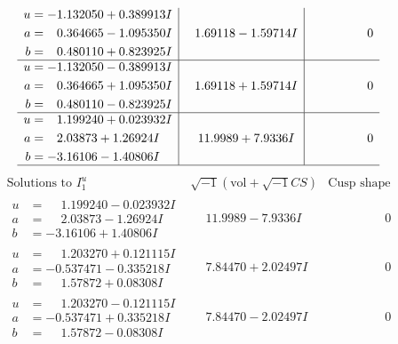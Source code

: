\documentclass[1p]{elsarticle_modified}
\theoremstyle{definition}
\newcommand{\I}{\sqrt{-1}}
\begin{document}
$$\begin{array}{c|c|c}
\begin{aligned}
u &= -1.132050 + 0.389913 I \\
a &= \phantom{-}0.364665 - 1.095350 I \\
b &= \phantom{-}0.480110 + 0.823925 I\end{aligned}
 & \phantom{-}1.69118 - 1.59714 I & \phantom{-0.000000 } 0 \\ \hline\begin{aligned}
u &= -1.132050 - 0.389913 I \\
a &= \phantom{-}0.364665 + 1.095350 I \\
b &= \phantom{-}0.480110 - 0.823925 I\end{aligned}
 & \phantom{-}1.69118 + 1.59714 I & \phantom{-0.000000 } 0 \\ \hline\begin{aligned}
u &= \phantom{-}1.199240 + 0.023932 I \\
a &= \phantom{-}2.03873 + 1.26924 I \\
b &= -3.16106 - 1.40806 I\end{aligned}
 & \phantom{-}11.9989 + 7.9336 I & \phantom{-0.000000 } 0\\
 \hline 
 \end{array}$$\newpage$$\begin{array}{c|c|c}  
\text{Solutions to }I^u_{1}& \I (\text{vol} + \sqrt{-1}CS) & \text{Cusp shape}\\
 \hline 
\begin{aligned}
u &= \phantom{-}1.199240 - 0.023932 I \\
a &= \phantom{-}2.03873 - 1.26924 I \\
b &= -3.16106 + 1.40806 I\end{aligned}
 & \phantom{-}11.9989 - 7.9336 I & \phantom{-0.000000 } 0 \\ \hline\begin{aligned}
u &= \phantom{-}1.203270 + 0.121115 I \\
a &= -0.537471 - 0.335218 I \\
b &= \phantom{-}1.57872 + 0.08308 I\end{aligned}
 & \phantom{-}7.84470 + 2.02497 I & \phantom{-0.000000 } 0 \\ \hline\begin{aligned}
u &= \phantom{-}1.203270 - 0.121115 I \\
a &= -0.537471 + 0.335218 I \\
b &= \phantom{-}1.57872 - 0.08308 I\end{aligned}
 & \phantom{-}7.84470 - 2.02497 I & \phantom{-0.000000 } 0 \\ \hline\begin{aligned}

\end{aligned}
\end{array}$$
\end{document}
